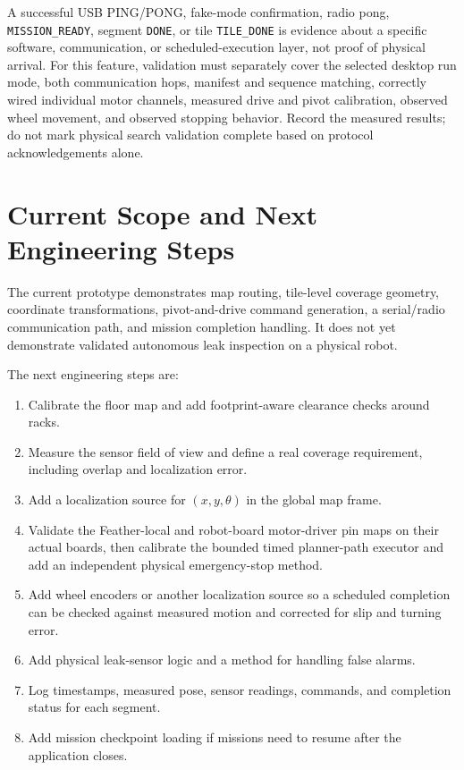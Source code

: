 \documentclass{article}
\begin{document}
A successful USB PING/PONG, fake-mode confirmation, radio pong, \texttt{MISSION\_READY}, segment \texttt{DONE}, or tile \texttt{TILE\_DONE} is evidence about a specific software, communication, or scheduled-execution layer, not proof of physical arrival. For this feature, validation must separately cover the selected desktop run mode, both communication hops, manifest and sequence matching, correctly wired individual motor channels, measured drive and pivot calibration, observed wheel movement, and observed stopping behavior. Record the measured results; do not mark physical search validation complete based on protocol acknowledgements alone.

\section{Current Scope and Next Engineering Steps}

The current prototype demonstrates map routing, tile-level coverage geometry, coordinate transformations, pivot-and-drive command generation, a serial/radio communication path, and mission completion handling. It does not yet demonstrate validated autonomous leak inspection on a physical robot.

The next engineering steps are:
\begin{enumerate}
    \item Calibrate the floor map and add footprint-aware clearance checks around racks.
    \item Measure the sensor field of view and define a real coverage requirement, including overlap and localization error.
    \item Add a localization source for $(x,y,\theta)$ in the global map frame.
    \item Validate the Feather-local and robot-board motor-driver pin maps on their actual boards, then calibrate the bounded timed planner-path executor and add an independent physical emergency-stop method.
    \item Add wheel encoders or another localization source so a scheduled completion can be checked against measured motion and corrected for slip and turning error.
    \item Add physical leak-sensor logic and a method for handling false alarms.
    \item Log timestamps, measured pose, sensor readings, commands, and completion status for each segment.
    \item Add mission checkpoint loading if missions need to resume after the application closes.
\end{enumerate}
\end{document}
